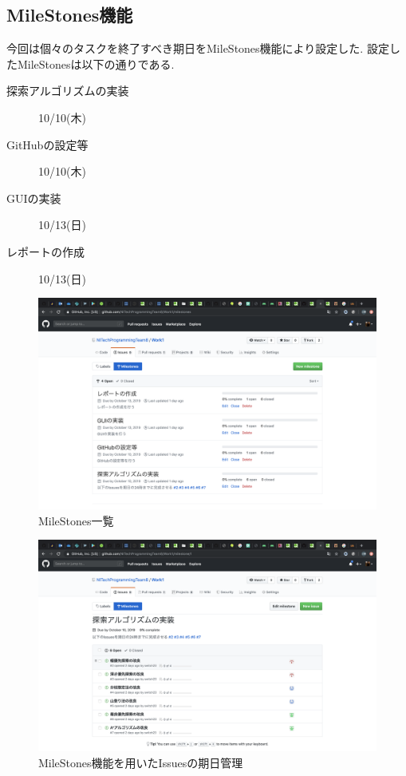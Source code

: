 \documentclass[uplatex,12pt]{jsarticle}
\begin{document}
\newpage

\subsection{MileStones機能}
今回は個々のタスクを終了すべき期日をMileStones機能により設定した.
設定したMileStonesは以下の通りである. \\
\begin{description}
  \item[探索アルゴリズムの実装] 10/10(木)
  \item[GitHubの設定等] 10/10(木)
  \item[GUIの実装] 10/13(日)
  \item[レポートの作成] 10/13(日)
\end{description}

\begin{figure}[!hbt]
  \centering
  \includegraphics[scale=0.20]{git_image/milestones_list_image.png}
  \caption{MileStones一覧}
\end{figure}

\begin{figure}[!hbt]
  \centering
  \includegraphics[scale=0.20]{git_image/milestones_image.png}
  \caption{MileStones機能を用いたIssuesの期日管理}
\end{figure}
\end{document}
